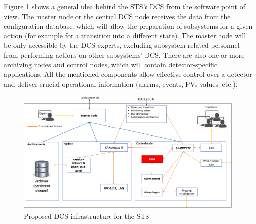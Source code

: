 Figure \ref{fig_arch} shows a general idea behind the \gls{STS}'s \gls{DCS} from the software point of view.  The master node or the central \gls{DCS} node receives the data from the configuration database, which will allow the preparation of subsystems for a given action (for example for a transition into a different state). The master node will be only accessible by the \gls{DCS} experts, excluding subsystem-related personnel from performing actions on other subsystems' \gls{DCS}. There are also one or more archiving nodes and control nodes, which will contain detector-specific applications. All the mentioned components allow effective control over a detector and deliver crucial operational information (alarms, events, \glspl{PV} values, etc.). 

\begin{figure}[!h]
\centering
\includegraphics[width=1\columnwidth]{Chapter3/Controls/images/DCS.png}
\caption{Proposed \gls{DCS} infrastructure for the \gls{STS}}
\label{fig_arch}
\end{figure}
\newpage





